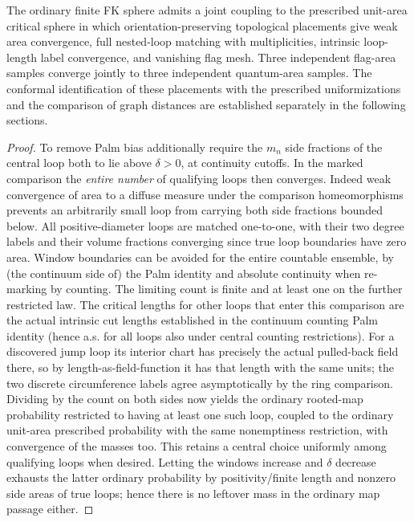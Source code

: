 \begin{corollary}\label{cut:unbiased}
The ordinary finite FK sphere admits a joint coupling to the prescribed
unit-area critical sphere in which orientation-preserving topological
placements give weak area convergence, full nested-loop matching with
multiplicities, intrinsic loop-length label convergence, and vanishing flag
mesh.  Three independent flag-area samples converge jointly to three
independent quantum-area samples.  The conformal identification of these
placements with the prescribed uniformizations and the comparison of graph
distances are established separately in the following sections.
\end{corollary}
\begin{proof}\leavevmode

To remove Palm bias additionally require the \(m_n\) side fractions of the central loop both to lie above \(\delta>0\), at continuity cutoffs.
In the marked comparison the \emph{entire number} of qualifying loops then converges.
Indeed weak convergence of area to a diffuse measure under the comparison homeomorphisms prevents an arbitrarily small loop from carrying both side fractions bounded below.
All positive-diameter loops are matched one-to-one, with their two degree labels and their volume fractions converging since true loop boundaries have zero area.
Window boundaries can be avoided for the entire countable ensemble, by (the continuum side of) the Palm identity and absolute continuity when re-marking by counting.
The limiting count is finite and at least one on the further restricted law.
The critical lengths for other loops that enter this comparison are the actual intrinsic cut lengths established in the continuum counting Palm identity (hence a.s. for all loops also under central counting restrictions).
For a discovered jump loop its interior chart has precisely the actual pulled-back field there, so by length-as-field-function it has that length with the same units; the two discrete circumference labels agree asymptotically by the ring comparison.
Dividing by the count on both sides now yields the ordinary rooted-map probability restricted to having at least one such loop, coupled to the ordinary unit-area prescribed probability with the same nonemptiness restriction, with convergence of the masses too.
This retains a central choice uniformly among qualifying loops when desired.
Letting the windows increase and \(\delta\) decrease exhausts the latter ordinary probability by positivity/finite length and nonzero side areas of true loops; hence there is no leftover mass in the ordinary map passage either.

\end{proof}
